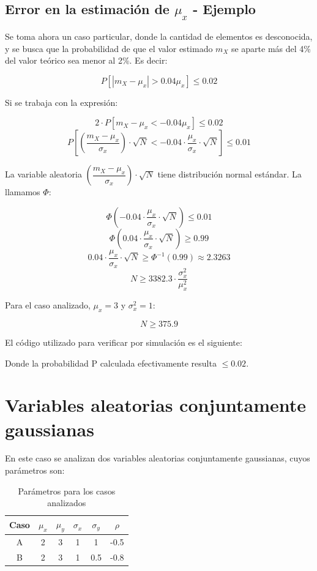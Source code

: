 \subsection{Error en la estimaci\'on de $\mu_x$ - Ejemplo}

Se toma ahora un caso particular, donde la cantidad de elementos es desconocida, y se busca que la probabilidad de que el valor estimado $m_X$ se aparte m\'as del 4\% del valor te\'orico sea menor al 2\%. Es decir:

\[
P[|m_X - \mu_x| > 0.04\mu_x] \leq 0.02
\]

Si se trabaja con la expresi\'on:

\[
2 \cdot P[m_X - \mu_x < -0.04\mu_x] \leq 0.02
\]
\[
P\left[\left( \frac{m_X - \mu_x}{\sigma_x} \right) \cdot \sqrt{N} < -0.04 \cdot \frac{\mu_x}{\sigma_x} \cdot \sqrt{N}\right] \leq 0.01
\]

La variable aleatoria $\left( \dfrac{m_X - \mu_x}{\sigma_x} \right) \cdot \sqrt{N}$ tiene distribuci\'on normal est\'andar. La llamamos $\Phi$:

\[
\Phi \left( -0.04 \cdot \frac{\mu_x}{\sigma_x} \cdot \sqrt{N} \right) \leq 0.01
\]
\[
\Phi \left( 0.04 \cdot \frac{\mu_x}{\sigma_x} \cdot \sqrt{N} \right) \geq 0.99
\]
\[
0.04 \cdot \frac{\mu_x}{\sigma_x} \cdot \sqrt{N} \geq \Phi^{-1}(0.99) \approx 2.3263
\]
\[
N \geq 3382.3 \cdot \frac{\sigma^2_x}{\mu^2_x}
\]

Para el caso analizado, $\mu_x = 3$ y $\sigma^2_x = 1$:

\[
N \geq 375.9
\]

El c\'odigo utilizado para verificar por simulaci\'on es el siguiente:



Donde la probabilidad P calculada efectivamente resulta $\leq 0.02$.

\newpage

\section{Variables aleatorias conjuntamente gaussianas}

En este caso se analizan dos variables aleatorias conjuntamente gaussianas, cuyos par\'ametros son:

\begin{table}[ht]
\begin{centering}
\begin{tabular}{|c||c|c|c|c|c|}
\hline 
Caso & $\mu_x$ & $\mu_y$ & $\sigma_x$ & $\sigma_y$ & $\rho$\\
\hline 
\hline 
A & 2 & 3 & 1 & 1 & -0.5\tabularnewline
\hline 
B & 2 & 3 & 1 & 0.5 & -0.8\tabularnewline
\hline 
\end{tabular}
\par\end{centering}
\caption{Par\'ametros para los casos analizados}

\end{table}


